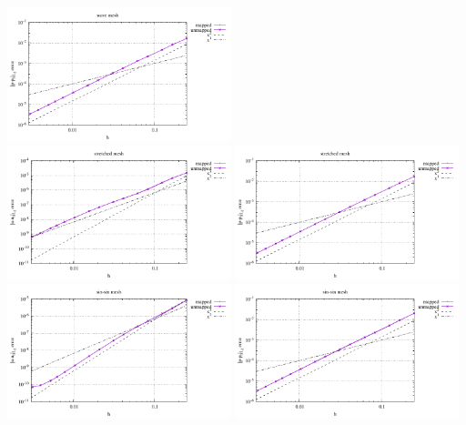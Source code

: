 \begin{center}
\includegraphics[width=6.5cm]{python_codes/fieldstone_76/results/bench4/straight/errors_P_mt3.pdf}\\
\includegraphics[width=6.5cm]{python_codes/fieldstone_76/results/bench4/straight/errors_V_mt4.pdf}
\includegraphics[width=6.5cm]{python_codes/fieldstone_76/results/bench4/straight/errors_P_mt4.pdf}\\
\includegraphics[width=6.5cm]{python_codes/fieldstone_76/results/bench4/straight/errors_V_mt5.pdf}
\includegraphics[width=6.5cm]{python_codes/fieldstone_76/results/bench4/straight/errors_P_mt5.pdf}\\

\end{center}
